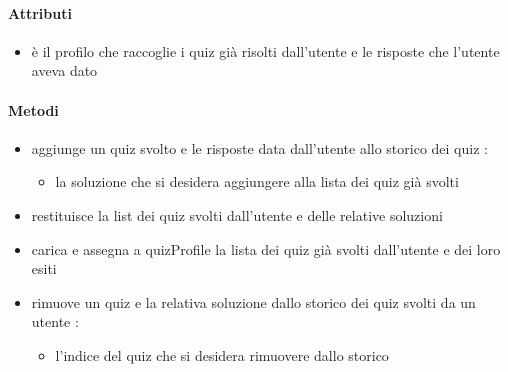 \paragraph{Attributi}
\begin{itemize}
\item {}
\newline
è il profilo che raccoglie i quiz già risolti dall'utente e le risposte che l'utente aveva dato
\end{itemize}
\paragraph{Metodi}
\begin{itemize}
\item {}
\newline
aggiunge un quiz svolto e le risposte data dall'utente allo storico dei quiz
\newline
{} :
\begin{itemize}
\item {}
\newline
la soluzione che si desidera aggiungere alla lista dei quiz già svolti
\end{itemize}
\item {}
\newline
restituisce la list dei quiz svolti dall'utente e delle relative soluzioni
\newline
\item {}
\newline
carica e assegna a quizProfile la lista dei quiz già svolti dall'utente e dei loro esiti
\newline
\item {}
\newline
rimuove un quiz e la relativa soluzione dallo storico dei quiz svolti da un utente
\newline
{} :
\begin{itemize}
\item {}
\newline
l'indice del quiz che si desidera rimuovere dallo storico
\end{itemize}
\end{itemize}
